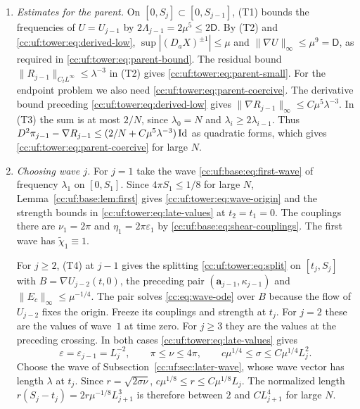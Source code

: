 \begin{enumerate}[leftmargin=*]
\item \emph{Estimates for the parent.}
On $[0,S_j]\subset[0,S_{j-1}]$, (T1) bounds the frequencies of $U=U_{j-1}$
by $2\Lambda_{j-1}=2\mu^5\le2\mathsf D$. By (T2) and
\eqref{cc:uf:tower:eq:derived-low}, $\sup|(D_aX)^{\pm1}|\le\mu$ and
$\|\nabla U\|_\infty\le\mu^9=\mathsf D$, as required in
\eqref{cc:uf:tower:eq:parent-bound}. The residual bound
$\|R_{j-1}\|_{C_tL^\infty}\le\lambda^{-3}$ in (T2) gives
\eqref{cc:uf:tower:eq:parent-small}. For the endpoint problem we also need
\eqref{cc:uf:tower:eq:parent-coercive}. The derivative bound preceding
\eqref{cc:uf:tower:eq:derived-low} gives $\|\nabla R_{j-1}\|_\infty
\le C\mu^5\lambda^{-3}$. In (T3) the sum is at most $2/N$, since $\lambda_0=N$ and
$\lambda_i\ge2\lambda_{i-1}$. Thus
$D^2\pi_{j-1}-\nabla R_{j-1}\le(2/N+C\mu^5\lambda^{-3})\operatorname{Id}$
as quadratic forms, which gives \eqref{cc:uf:tower:eq:parent-coercive} for large $N$.

\item \emph{Choosing wave $j$.}
For $j=1$ take the wave \eqref{cc:uf:base:eq:first-wave} of frequency
$\lambda_1$ on $[0,S_1]$. Since $4\pi S_1\le1/8$ for large $N$,
Lemma~\ref{cc:uf:base:lem:first} gives \eqref{cc:uf:tower:eq:wave-origin}
and the strength bounds in \eqref{cc:uf:tower:eq:late-values} at
$t_2=t_1=0$. The couplings there are $\nu_1=2\pi$ and
$\eta_1=2\pi\varepsilon_1$ by \eqref{cc:uf:base:eq:shear-couplings}.
The first wave has $\widetilde\chi_1\equiv1$.

For $j\ge2$, (T4) at $j-1$ gives the splitting
\eqref{cc:uf:tower:eq:split} on $[t_j,S_j]$ with $B=\nabla U_{j-2}(t,0)$,
the preceding pair $(\mathbf a_{j-1},\kappa_{j-1})$ and
$\|E_c\|_\infty\le\mu^{-1/4}$. The pair solves \eqref{cc:eq:wave-ode}
over $B$ because the flow of $U_{j-2}$ fixes the origin. Freeze its
couplings and strength at $t_j$. For $j=2$ these are the values of
wave~$1$ at time zero. For $j\ge3$ they are the values at the preceding crossing.
In both cases \eqref{cc:uf:tower:eq:late-values} gives
\[
 \varepsilon=\varepsilon_{j-1}=L_j^{-2},\qquad
 \pi\le\nu\le4\pi,\qquad
 c\mu^{1/4}\le\sigma\le C\mu^{1/4}L_j^2 .
\]
Choose the wave of Subsection~\ref{cc:uf:sec:later-wave}, whose wave
vector has length $\lambda$ at $t_j$. Since $r=\sqrt{2\sigma\nu}$,
$c\mu^{1/8}\le r\le C\mu^{1/8}L_j$. The normalized length
$r(S_j-t_j)=2r\mu^{-1/8}L_{j+1}^3$ is therefore between $2$ and
$CL_{j+1}^4$ for large $N$.


\end{enumerate}
